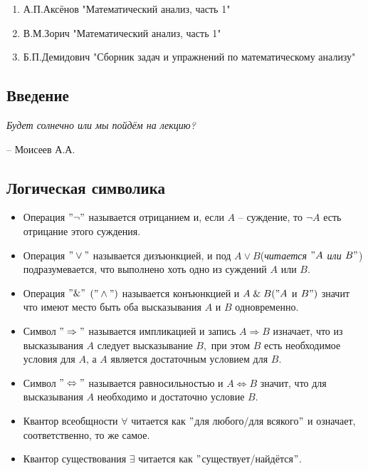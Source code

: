 \documentclass{article}
\begin{document}
\smallskip

\begin{enumerate}
\item А.П.Аксёнов "Математический анализ, часть 1"
\item В.М.Зорич "Математический анализ, часть 1"
\item Б.П.Демидович "Сборник задач и упражнений по математическому анализу"
\end{enumerate}

\newpage 
\begin{center}

\smallskip
\smallskip
\smallskip
\smallskip

\section{\LARGE{\bf Введение}}


\end{center}

\epigraph{\textit{Будет солнечно или мы пойдём на лекцию?}}
{-- Моисеев А.А.}

\subsection{Логическая символика}

\begin{itemize}
\item Операция $"\neg"$ называется отрицанием и, если $A$ -- суждение, то $\neg A$ есть отрицание этого суждения.
\item Операция $"\vee"$ называется дизъюнкцией, и под $A \vee B$(\textit{читается $"A$ или $B"$}) подразумевается, что выполнено хоть одно из суждений $A$ или $B.$

\item Операция $"\&"$ $("\wedge")$ называется конъюнкцией и $A\;\&\;B("A$ и $B")$ значит что имеют место быть оба высказывания $A$ и $B$ одновременно.

\item Символ $"\Rightarrow"$ называется импликацией и запись $A \Rightarrow B$ изначает, что из высказывания $A$ следует высказывание $B,$ при этом $B$ есть необходимое условия для $A$, а $A$ является достаточным условием для $B.$

\item Символ $"\Leftrightarrow"$ называется равносильностью и $A \Leftrightarrow B$ значит, что для высказывания $A$ необходимо и достаточно условие $B.$

\item Квантор всеобщности $\forall$ читается как $"$для любого/для всякого$"$ и означает, соответственно, то же самое.

\item Квантор существования $\exists$ читается как $"$существует/найдётся$"$.
\end{itemize}
\end{document}
